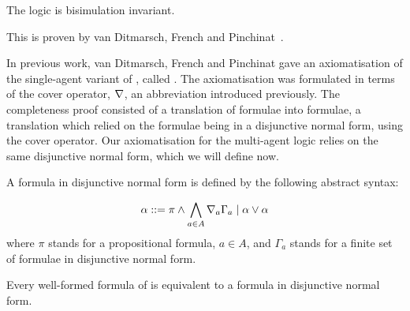 
\begin{lemma}
The logic \logicKF{} is bisimulation invariant.
\end{lemma}

This is proven by van Ditmarsch, French and Pinchinat~\cite{french2010future}.


In previous work, van Ditmarsch, French and Pinchinat gave an axiomatisation of
the single-agent variant of \logicKF{}, called \logicKiF{}. The axiomatisation
was formulated in terms of the cover operator, $\nabla$, an abbreviation
introduced previously. The completeness proof consisted of a translation of
\logicKiF{} formulae into \logicKi{} formulae, a translation which relied on the
formulae being in a disjunctive normal form, using the cover operator. Our
axiomatisation for the multi-agent logic \logicKF{} relies on the same
disjunctive normal form, which we will define now.

\begin{definition}
A formula in disjunctive normal form is defined by the following abstract syntax:

$$
\alpha ::= \pi \land \bigwedge_{a \in A} \nabla_a \Gamma_a \mid \alpha \lor \alpha
$$
where $\pi$ stands for a propositional formula, $a \in A$, and $\Gamma_a$ stands
for a finite set of formulae in disjunctive normal form.
\end{definition}

\begin{lemma}\label{k-dnf}
Every well-formed formula of \logicK{} is equivalent to a formula in disjunctive
normal form.
\end{lemma}

